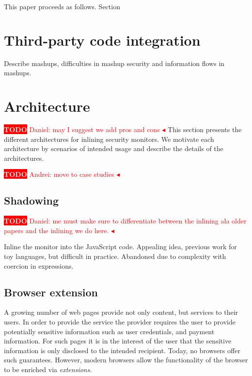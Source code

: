 \documentclass{llncs}
\newcommand{\todo}[1]{\colorbox{red}{\textcolor{white}{\sffamily\bfseries\scriptsize TODO}} \textcolor{red}{#1} \textcolor{red}{$\blacktriangleleft$}}
\begin{document}
This paper proceeds as follows. Section~


\section{Third-party code integration}
\label{sec:mash}

Describe mashups, difficulties in mashup security and information flows in mashups.

\section{Architecture}
\label{sec:arch}

\todo{Daniel: may I suggest we add pros and cons}
This section presents the different architectures for inlining
security monitors. We motivate each architecture by scenarios of
intended usage and describe the details of the architectures.



\todo{Andrei: move to case studies}
\subsection{Shadowing}
\todo{Daniel: me must make sure to differentiate between the inlining ala older papers and the inlining we do here.}

Inline the monitor into the JavaScript code. Appealing idea, previous work for 
toy languages, but difficult in practice. Abandoned due to complexity with 
coercion in expressions.


\subsection{Browser extension}

A growing number of web pages provide not only content, but services to their
users. In order to provide the service the provider requires the user to
provide potentially sensitive information such as user credentials, and payment
information. For such pages it is in the interest of the user that the
sensitive information is only disclosed to the intended recipient.  Today, no
browsers offer such guarantees. However, modern browsers allow the
functionality of the browser to be enriched via \emph{extensions}. 
\end{document}

